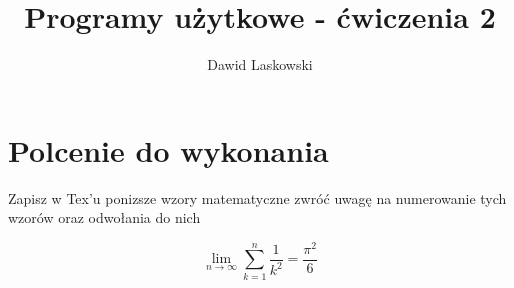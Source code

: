 \documentclass[a4paper,12pt]{article}
\title{Programy użytkowe - ćwiczenia 2 }
\author{Dawid Laskowski}
\begin{document}
\maketitle

\section{ Polcenie do wykonania}\label{sec:tekst}

Zapisz w Tex'u ponizsze wzory matematyczne zwróć uwagę na numerowanie tych wzorów oraz odwołania do nich 

$$ \lim_{n \to \infty}
\sum_{k=1}^n\frac{1}{k^2}
= \frac{\pi^2}{6}$$
\end{document}
